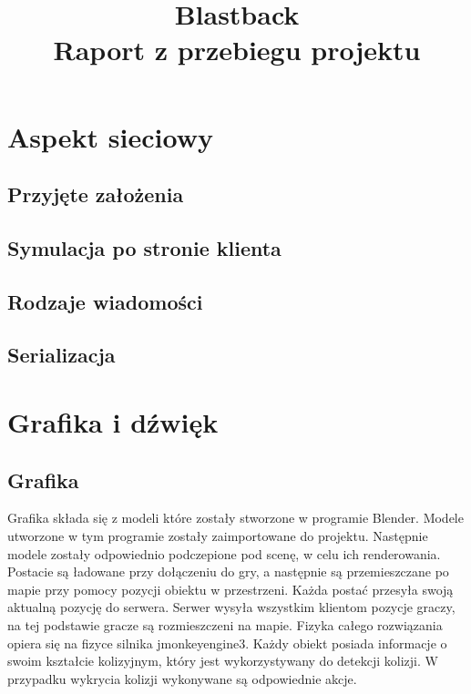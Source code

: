 \documentclass[]{report}
\begin{document}
\title{Blastback \\
	\Large Raport z przebiegu projektu}
\maketitle



\chapter*{Aspekt sieciowy}
\section{Przyjęte założenia}
\section{Symulacja po stronie klienta}
\section{Rodzaje wiadomości}
\section{Serializacja}



\chapter*{Grafika i dźwięk}
\section{Grafika}
	Grafika składa się z modeli które zostały stworzone w programie Blender.
	Modele utworzone w tym programie zostały zaimportowane do projektu.
	Następnie modele zostały odpowiednio podczepione pod scenę, w celu ich renderowania.
	Postacie są ładowane przy dołączeniu do gry, a następnie są przemieszczane po mapie przy pomocy pozycji obiektu w przestrzeni.
	Każda postać przesyła swoją aktualną pozycję do serwera.
	Serwer wysyła wszystkim klientom pozycje graczy, na tej podstawie gracze są rozmieszczeni na mapie.
	Fizyka całego rozwiązania opiera się na fizyce silnika jmonkeyengine3.
	Każdy obiekt posiada informacje o swoim kształcie kolizyjnym, który jest wykorzystywany do detekcji kolizji.
	W przypadku wykrycia kolizji wykonywane są odpowiednie akcje.
\end{document}
